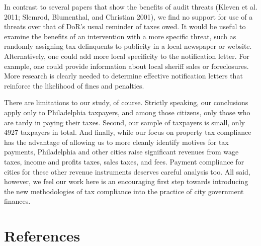\documentclass[12pt,titlepage]{article}
\begin{document}
In contrast to several papers that show the benefits of audit threats
(Kleven et al. 2011; Slemrod, Blumenthal, and Christian 2001), we find
no support for use of a threats over that of DoR's usual reminder of
taxes owed.  It would be useful to examine the benefits of an
intervention with a more specific threat, such as randomly assigning
tax delinquents to publicity in a local newspaper or website.
Alternatively, one could add more local specificity to the
notification letter. For example, one could provide information about
local sheriff sales or foreclosures. More research is clearly needed
to determine effective notification letters that reinforce the
likelihood of fines and penalties.


There are limitations to our study, of course.  Strictly speaking, our
conclusions apply only to Philadelphia taxpayers, and among those
citizens, only those who are tardy in paying their taxes. Second, our
sample of taxpayers is small, only  4927 taxpayers in total.  And finally, while
our focus on property tax compliance has the advantage of allowing us
to more cleanly identify motives for tax payments, Philadelphia and
other cities raise significant revenues from wage taxes, income and
profits taxes, sales taxes, and fees.  Payment compliance for cities
for these other revenue instruments deserves careful analysis too.
All said, however, we feel our work here is an encouraging first step
towards introducing the new methodologies of tax compliance into the
practice of city government finances.

\newpage

\section*{References}
\end{document}
